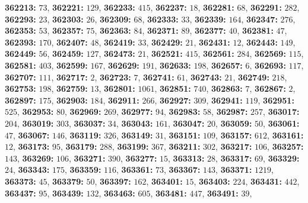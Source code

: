 \textsf{\bfseries 362213:} $73$, \textsf{\bfseries 362221:} $129$, \textsf{\bfseries 362233:} $415$, \textsf{\bfseries 362237:} $18$, \textsf{\bfseries 362281:} $68$, \textsf{\bfseries 362291:} $282$, \textsf{\bfseries 362293:} $23$, \textsf{\bfseries 362303:} $26$, \textsf{\bfseries 362309:} $68$, \textsf{\bfseries 362333:} $33$, \textsf{\bfseries 362339:} $164$, \textsf{\bfseries 362347:} $276$, \textsf{\bfseries 362353:} $53$, \textsf{\bfseries 362357:} $75$, \textsf{\bfseries 362363:} $84$, \textsf{\bfseries 362371:} $89$, \textsf{\bfseries 362377:} $40$, \textsf{\bfseries 362381:} $47$, \textsf{\bfseries 362393:} $170$, \textsf{\bfseries 362407:} $48$, \textsf{\bfseries 362419:} $33$, \textsf{\bfseries 362429:} $21$, \textsf{\bfseries 362431:} $12$, \textsf{\bfseries 362443:} $149$, \textsf{\bfseries 362449:} $56$, \textsf{\bfseries 362459:} $127$, \textsf{\bfseries 362473:} $21$, \textsf{\bfseries 362521:} $415$, \textsf{\bfseries 362561:} $284$, \textsf{\bfseries 362569:} $115$, \textsf{\bfseries 362581:} $403$, \textsf{\bfseries 362599:} $167$, \textsf{\bfseries 362629:} $191$, \textsf{\bfseries 362633:} $198$, \textsf{\bfseries 362657:} $6$, \textsf{\bfseries 362693:} $117$, \textsf{\bfseries 362707:} $111$, \textsf{\bfseries 362717:} $2$, \textsf{\bfseries 362723:} $7$, \textsf{\bfseries 362741:} $61$, \textsf{\bfseries 362743:} $21$, \textsf{\bfseries 362749:} $218$, \textsf{\bfseries 362753:} $198$, \textsf{\bfseries 362759:} $13$, \textsf{\bfseries 362801:} $1061$, \textsf{\bfseries 362851:} $740$, \textsf{\bfseries 362863:} $7$, \textsf{\bfseries 362867:} $2$, \textsf{\bfseries 362897:} $175$, \textsf{\bfseries 362903:} $184$, \textsf{\bfseries 362911:} $266$, \textsf{\bfseries 362927:} $309$, \textsf{\bfseries 362941:} $119$, \textsf{\bfseries 362951:} $525$, \textsf{\bfseries 362953:} $80$, \textsf{\bfseries 362969:} $269$, \textsf{\bfseries 362977:} $94$, \textsf{\bfseries 362983:} $58$, \textsf{\bfseries 362987:} $257$, \textsf{\bfseries 363017:} $204$, \textsf{\bfseries 363019:} $303$, \textsf{\bfseries 363037:} $34$, \textsf{\bfseries 363043:} $161$, \textsf{\bfseries 363047:} $20$, \textsf{\bfseries 363059:} $50$, \textsf{\bfseries 363061:} $47$, \textsf{\bfseries 363067:} $146$, \textsf{\bfseries 363119:} $326$, \textsf{\bfseries 363149:} $31$, \textsf{\bfseries 363151:} $109$, \textsf{\bfseries 363157:} $612$, \textsf{\bfseries 363161:} $12$, \textsf{\bfseries 363173:} $95$, \textsf{\bfseries 363179:} $288$, \textsf{\bfseries 363199:} $367$, \textsf{\bfseries 363211:} $302$, \textsf{\bfseries 363217:} $106$, \textsf{\bfseries 363257:} $143$, \textsf{\bfseries 363269:} $106$, \textsf{\bfseries 363271:} $390$, \textsf{\bfseries 363277:} $15$, \textsf{\bfseries 363313:} $28$, \textsf{\bfseries 363317:} $69$, \textsf{\bfseries 363329:} $24$, \textsf{\bfseries 363343:} $175$, \textsf{\bfseries 363359:} $116$, \textsf{\bfseries 363361:} $73$, \textsf{\bfseries 363367:} $143$, \textsf{\bfseries 363371:} $1219$, \textsf{\bfseries 363373:} $45$, \textsf{\bfseries 363379:} $50$, \textsf{\bfseries 363397:} $162$, \textsf{\bfseries 363401:} $15$, \textsf{\bfseries 363403:} $224$, \textsf{\bfseries 363431:} $442$, \textsf{\bfseries 363437:} $95$, \textsf{\bfseries 363439:} $132$, \textsf{\bfseries 363463:} $605$, \textsf{\bfseries 363481:} $447$, \textsf{\bfseries 363491:} $39$, 
